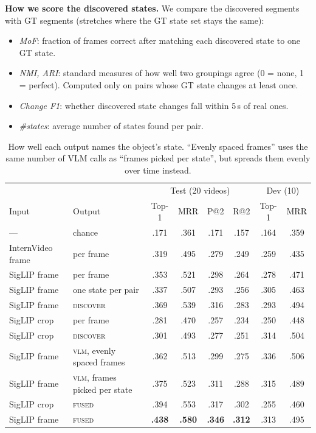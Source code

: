 \documentclass[10pt]{article}
\begin{document}
\textbf{How we score the discovered states.} We compare the discovered segments with GT segments (stretches
where the GT state set stays the same):
\begin{itemize}
\item \emph{MoF}: fraction of frames correct after matching each discovered state to one GT state.
\item \emph{NMI, ARI}: standard measures of how well two groupings agree (0 = none, 1 = perfect). Computed
only on pairs whose GT state changes at least once.
\item \emph{Change F1}: whether discovered state changes fall within 5\,s of real ones.
\item \emph{\#states}: average number of states found per pair.
\end{itemize}

\begin{table}[h]\centering\small
\begin{tabular}{llcccccc}
\toprule
 & & \multicolumn{4}{c}{Test (20 videos)} & \multicolumn{2}{c}{Dev (10)}\\
Input & Output & Top-1 & MRR & P@2 & R@2 & Top-1 & MRR\\
\midrule
--- & chance & .171 & .361 & .171 & .157 & .164 & .359\\
InternVideo frame & per frame & .319 & .495 & .279 & .249 & .259 & .435\\
SigLIP frame & per frame & .353 & .521 & .298 & .264 & .278 & .471\\
SigLIP frame & one state per pair & .337 & .507 & .293 & .256 & .305 & .463\\
SigLIP frame & \textsc{discover} & .369 & .539 & .316 & .283 & .293 & .494\\
SigLIP crop & per frame & .281 & .470 & .257 & .234 & .250 & .448\\
SigLIP crop & \textsc{discover} & .301 & .493 & .277 & .251 & .314 & .504\\
SigLIP frame & \textsc{vlm}, evenly spaced frames & .362 & .513 & .299 & .275 & .336 & .506\\
SigLIP frame & \textsc{vlm}, frames picked per state & .375 & .523 & .311 & .288 & .315 & .489\\
SigLIP crop & \textsc{fused} & .394 & .553 & .317 & .302 & .255 & .460\\
SigLIP frame & \textsc{fused} & \textbf{.438} & \textbf{.580} & \textbf{.346} & \textbf{.312} & .313 & .495\\
\bottomrule
\end{tabular}
\caption{How well each output names the object's state. ``Evenly spaced frames'' uses the same number of VLM
calls as ``frames picked per state'', but spreads them evenly over time instead.}
\end{table}
\end{document}

